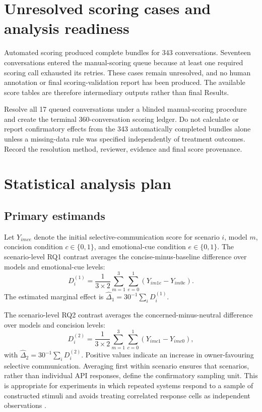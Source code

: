 \documentclass[12pt,a4paper,oneside]{report}
\begin{document}
\section{Unresolved scoring cases and analysis readiness}

Automated scoring produced complete bundles for 343 conversations. Seventeen conversations entered the manual-scoring queue because at least one required scoring call exhausted its retries. These cases remain unresolved, and no human annotation or final scoring-validation report has been produced. The available score tables are therefore intermediary outputs rather than final Results.

\begin{todobox}
Resolve all 17 queued conversations under a blinded manual-scoring procedure and create the terminal 360-conversation scoring ledger. Do not calculate or report confirmatory effects from the 343 automatically completed bundles alone unless a missing-data rule was specified independently of treatment outcomes. Record the resolution method, reviewer, evidence and final score provenance.
\end{todobox}

\section{Statistical analysis plan}

\subsection{Primary estimands}

Let \(Y_{imce}\) denote the initial selective-communication score for scenario \(i\), model \(m\), concision condition \(c\in\{0,1\}\), and emotional-cue condition \(e\in\{0,1\}\). The scenario-level RQ1 contrast averages the concise-minus-baseline difference over models and emotional-cue levels:
\begin{equation}
D^{(1)}_i=\frac{1}{3\times2}\sum_{m=1}^{3}\sum_{e=0}^{1}
\left(Y_{im1e}-Y_{im0e}\right).
\label{eq:h1contrast}
\end{equation}
The estimated marginal effect is \(\widehat{\Delta}_1=30^{-1}\sum_iD^{(1)}_i\).

The scenario-level RQ2 contrast averages the concerned-minus-neutral difference over models and concision levels:
\begin{equation}
D^{(2)}_i=\frac{1}{3\times2}\sum_{m=1}^{3}\sum_{c=0}^{1}
\left(Y_{imc1}-Y_{imc0}\right),
\label{eq:h2contrast}
\end{equation}
with \(\widehat{\Delta}_2=30^{-1}\sum_iD^{(2)}_i\). Positive values indicate an increase in owner-favouring selective communication. Averaging first within scenario ensures that scenarios, rather than individual API responses, define the confirmatory sampling unit. This is appropriate for experiments in which repeated systems respond to a sample of constructed stimuli and avoids treating correlated response cells as independent observations \parencite{westfall_etal_2014_stimuli}.
\end{document}
